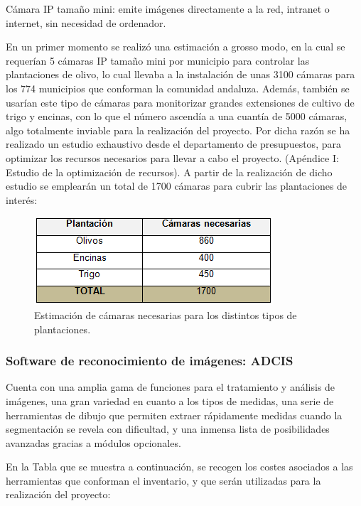 \documentclass[12pt,oneside,a4paper]{article}
\numberwithin{figure}{section}
\begin{document}
Cámara IP tamaño mini: emite imágenes directamente a la red, intranet o internet, sin necesidad de ordenador.

En un primer momento se realizó una estimación a grosso modo, en la cual se requerían 5 cámaras IP tamaño mini por municipio para controlar las plantaciones de olivo, lo cual llevaba a la instalación de unas 3100 cámaras para los 774 municipios que conforman la comunidad andaluza. Además, también se usarían este tipo de cámaras para monitorizar grandes extensiones de cultivo de trigo y encinas, con lo que el número ascendía a una cuantía de 5000 cámaras, algo totalmente inviable para la realización del proyecto. Por dicha razón se ha realizado un estudio exhaustivo desde el departamento de presupuestos, para optimizar los recursos necesarios para llevar a cabo el proyecto. (Apéndice I: Estudio de la optimización de recursos). A partir de la realización de dicho estudio se emplearán un total de 1700 cámaras para cubrir las plantaciones de interés:

\begin{figure}[H]
\begin{center}
\includegraphics[scale=.8]{Presupuesto7.png}
\caption{Estimación de cámaras necesarias para los distintos tipos de plantaciones.}
\end{center}
\end{figure}

\subsubsection{Software de reconocimiento de imágenes: ADCIS}

Cuenta con una amplia gama de funciones para el tratamiento y análisis de imágenes, una gran variedad en cuanto a los tipos de medidas, una serie de herramientas de dibujo que permiten extraer rápidamente medidas cuando la segmentación se revela con dificultad, y una inmensa lista de posibilidades avanzadas gracias a módulos opcionales.

En la Tabla que se muestra a continuación, se recogen los costes asociados a las herramientas que conforman el inventario, y que serán utilizadas para la realización del proyecto:
\end{document}
